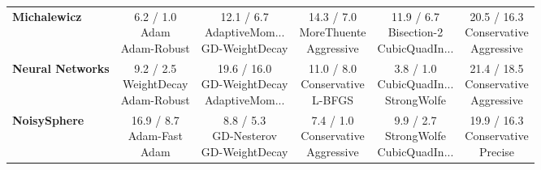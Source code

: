 \documentclass[10pt]{article}
\begin{document}
\begin{longtable}{lccccc}
\textbf{Michalewicz} & \cellcolor{green!20} \makecell{6.2 / 1.0 \\ \scriptsize{Adam} \\ \scriptsize{Adam-Robust}}&  \makecell{12.1 / 6.7 \\ \scriptsize{AdaptiveMom...} \\ \scriptsize{GD-WeightDecay}}&  \makecell{14.3 / 7.0 \\ \scriptsize{MoreThuente} \\ \scriptsize{Aggressive}}&  \makecell{11.9 / 6.7 \\ \scriptsize{Bisection-2} \\ \scriptsize{CubicQuadIn...}}& \cellcolor{red!15} \makecell{20.5 / 16.3 \\ \scriptsize{Conservative} \\ \scriptsize{Aggressive}} \\
\textbf{Neural Networks} &  \makecell{9.2 / 2.5 \\ \scriptsize{WeightDecay} \\ \scriptsize{Adam-Robust}}&  \makecell{19.6 / 16.0 \\ \scriptsize{GD-WeightDecay} \\ \scriptsize{AdaptiveMom...}}&  \makecell{11.0 / 8.0 \\ \scriptsize{Conservative} \\ \scriptsize{L-BFGS}}& \cellcolor{green!20} \makecell{3.8 / 1.0 \\ \scriptsize{CubicQuadIn...} \\ \scriptsize{StrongWolfe}}& \cellcolor{red!15} \makecell{21.4 / 18.5 \\ \scriptsize{Conservative} \\ \scriptsize{Aggressive}} \\
\textbf{NoisySphere} &  \makecell{16.9 / 8.7 \\ \scriptsize{Adam-Fast} \\ \scriptsize{Adam}}&  \makecell{8.8 / 5.3 \\ \scriptsize{GD-Nesterov} \\ \scriptsize{GD-WeightDecay}}& \cellcolor{green!20} \makecell{7.4 / 1.0 \\ \scriptsize{Conservative} \\ \scriptsize{Aggressive}}&  \makecell{9.9 / 2.7 \\ \scriptsize{StrongWolfe} \\ \scriptsize{CubicQuadIn...}}& \cellcolor{red!15} \makecell{19.9 / 16.3 \\ \scriptsize{Conservative} \\ \scriptsize{Precise}} \\

\end{longtable}
\end{document}
